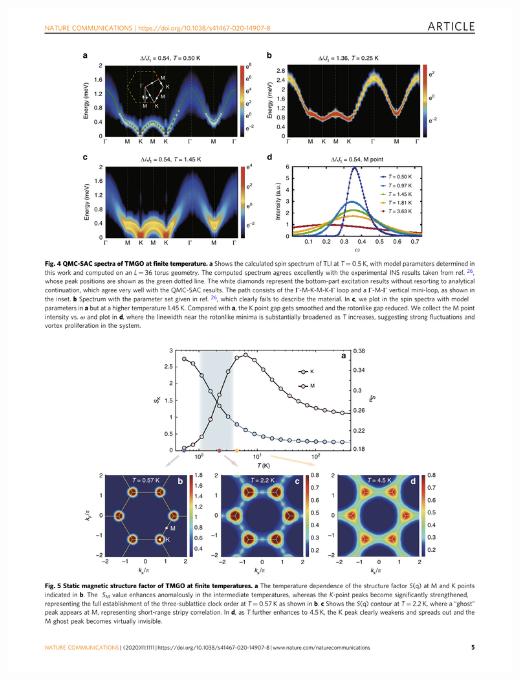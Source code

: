 \documentclass[xcolor=table, aspectratio=1610,ignorenonframetext]{beamer}
\begin{document}
\begin{frame}
\begin{columns}
\begin{itemize}
      \includegraphics[width=.8\textwidth]{spinwave-fit1}
    \end{itemize}
  \end{columns}
\end{frame}
\end{document}

